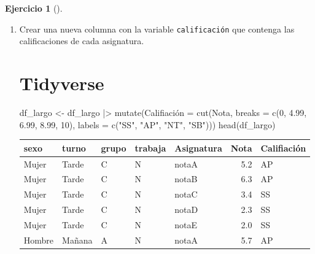 \documentclass[
  a4paper,
]{scrreport}
\newenvironment{Shaded}{\begin{snugshade}}{\end{snugshade}}
\newcommand{\AttributeTok}[1]{\textcolor[rgb]{0.40,0.45,0.13}{#1}}
\newcommand{\DecValTok}[1]{\textcolor[rgb]{0.68,0.00,0.00}{#1}}
\newcommand{\FloatTok}[1]{\textcolor[rgb]{0.68,0.00,0.00}{#1}}
\newcommand{\FunctionTok}[1]{\textcolor[rgb]{0.28,0.35,0.67}{#1}}
\newcommand{\NormalTok}[1]{\textcolor[rgb]{0.00,0.23,0.31}{#1}}
\newcommand{\OtherTok}[1]{\textcolor[rgb]{0.00,0.23,0.31}{#1}}
\newcommand{\SpecialCharTok}[1]{\textcolor[rgb]{0.37,0.37,0.37}{#1}}
\newcommand{\StringTok}[1]{\textcolor[rgb]{0.13,0.47,0.30}{#1}}
\theoremstyle{definition}
\newtheorem{exercise}{Ejercicio}[chapter]
\theoremstyle{remark}
\begin{document}
\begin{exercise}[]
\begin{enumerate}
\begin{tcolorbox}
  \end{tcolorbox}
\item
  Crear una nueva columna con la variable \texttt{calificación} que
  contenga las calificaciones de cada asignatura.

  \begin{tcolorbox}[enhanced jigsaw, colframe=quarto-callout-tip-color-frame, toprule=.15mm, bottomtitle=1mm, breakable, opacitybacktitle=0.6, toptitle=1mm, colback=white, bottomrule=.15mm, title=\textcolor{quarto-callout-tip-color}{\faLightbulb}\hspace{0.5em}{Solución}, arc=.35mm, left=2mm, titlerule=0mm, rightrule=.15mm, coltitle=black, leftrule=.75mm, opacityback=0, colbacktitle=quarto-callout-tip-color!10!white]

  \section{Tidyverse}

\begin{Shaded}
\begin{Highlighting}[]
\NormalTok{df\_largo }\OtherTok{\textless{}{-}}\NormalTok{ df\_largo }\SpecialCharTok{|\textgreater{}}
    \FunctionTok{mutate}\NormalTok{(Califiación }\OtherTok{=} \FunctionTok{cut}\NormalTok{(Nota, }\AttributeTok{breaks =} \FunctionTok{c}\NormalTok{(}\DecValTok{0}\NormalTok{, }\FloatTok{4.99}\NormalTok{, }\FloatTok{6.99}\NormalTok{, }\FloatTok{8.99}\NormalTok{, }\DecValTok{10}\NormalTok{), }\AttributeTok{labels =} \FunctionTok{c}\NormalTok{(}\StringTok{"SS"}\NormalTok{, }\StringTok{"AP"}\NormalTok{, }\StringTok{"NT"}\NormalTok{, }\StringTok{"SB"}\NormalTok{)))}
\FunctionTok{head}\NormalTok{(df\_largo)}
\end{Highlighting}
\end{Shaded}

  \begin{longtable}[]{@{}lllllrl@{}}
  \toprule\noalign{}
  sexo & turno & grupo & trabaja & Asignatura & Nota & Califiación \\
  \midrule\noalign{}
  \endhead
  \bottomrule\noalign{}
  \endlastfoot
  Mujer & Tarde & C & N & notaA & 5.2 & AP \\
  Mujer & Tarde & C & N & notaB & 6.3 & AP \\
  Mujer & Tarde & C & N & notaC & 3.4 & SS \\
  Mujer & Tarde & C & N & notaD & 2.3 & SS \\
  Mujer & Tarde & C & N & notaE & 2.0 & SS \\
  Hombre & Mañana & A & N & notaA & 5.7 & AP \\
  \end{longtable}


\end{tcolorbox}
\end{enumerate}
\end{exercise}
\end{document}
